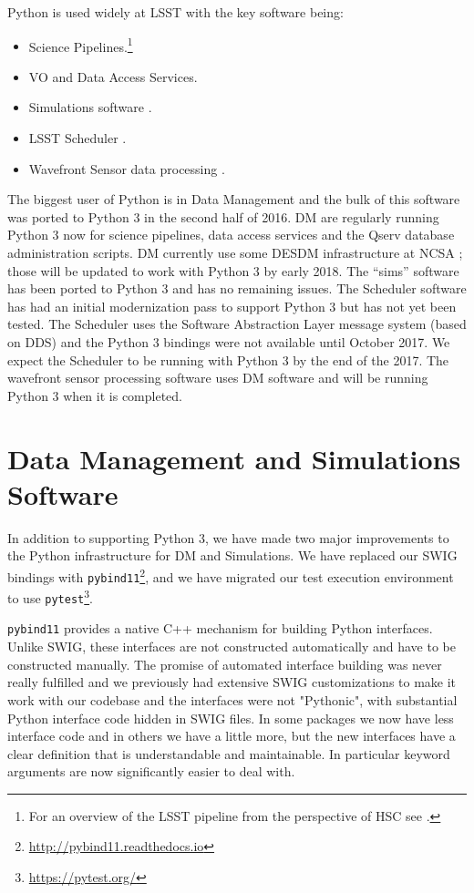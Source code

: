 \documentclass[11pt,twoside]{article}
\begin{document}
Python is used widely at LSST with the key software being:
\begin{itemize}
\item Science Pipelines.\footnote{For an overview of the LSST pipeline from the perspective of HSC see \citet{2017arXiv170506766B}.}
\item VO and Data Access Services.
\item Simulations software \citep{2014SPIE.9150E..14C}.
\item LSST Scheduler \citep{2016SPIE.9910E..13D}.
\item Wavefront Sensor data processing \citep{2016SPIE.9906E..3BT}.
\end{itemize}
The biggest user of Python is in Data Management \citep[DM;][]{O3-1_adassxxv} and the bulk of this software was ported to Python 3 in the second half of 2016.
DM are regularly running Python 3 now for science pipelines, data access services and the Qserv database administration scripts.
DM currently use some DESDM infrastructure at NCSA \citep{2012SPIE.8451E..0DM}; those will be updated to work with Python 3 by early 2018.
The ``sims'' software has been ported to Python 3 and has no remaining issues.
The Scheduler software has had an initial modernization pass to support Python 3 but has not yet been tested.
The Scheduler uses the Software Abstraction Layer \citep[SAL;][]{2016SPIE.9906E..5CM} message system (based on DDS) \citep{2016SPIE.9911E..25R} and the Python 3 bindings were not available until October 2017.
We expect the Scheduler to be running with Python 3 by the end of the 2017.
The wavefront sensor processing software uses DM software and will be running Python 3 when it is completed.

\section{Data Management and Simulations Software}

In addition to supporting Python 3, we have made two major improvements to the Python infrastructure for DM and Simulations.
We have replaced our SWIG bindings \citep{beazley2003automated} with \texttt{pybind11}\footnote{\url{http://pybind11.readthedocs.io}}, and we have migrated our test execution environment to use \texttt{pytest}\footnote{\url{https://pytest.org/}}.

\texttt{pybind11} provides a native C++ mechanism for building Python interfaces.
Unlike SWIG, these interfaces are not constructed automatically and have to be constructed manually.
The promise of automated interface building was never really fulfilled and we previously had extensive SWIG customizations to make it work with our codebase and the interfaces were not "Pythonic", with substantial Python interface code hidden in SWIG files.
In some packages we now have less interface code and in others we have a little more, but the new interfaces have a clear definition that is understandable and maintainable.
In particular keyword arguments are now significantly easier to deal with.
\end{document}
